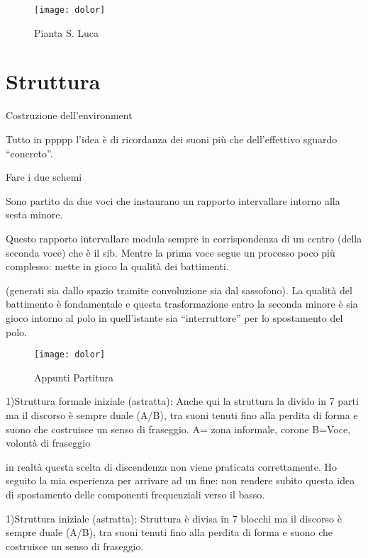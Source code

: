 \begin{figure}
\centering
{\texttt{[image: dolor]}}
\caption[Pianta S. Luca]{Pianta S. Luca}
\label{fig:tetratetra}
\end{figure}

\section*{Struttura}
\label{sec:struttura}

Costruzione dell'environment


Tutto in ppppp l'idea  è di ricordanza dei suoni più che dell'effettivo sguardo “concreto”.

Fare i due schemi

Sono partito da due voci che instaurano un rapporto intervallare intorno alla sesta minore.

Questo rapporto intervallare modula sempre in corrispondenza di un centro
(della seconda voce) che è il sib. Mentre  la prima voce segue un processo poco
più complesso: mette in gioco la qualità dei battimenti.

(generati sia dallo spazio tramite convoluzione sia dal sassofono).
La qualità del battimento è fondamentale e questa trasformazione entro la seconda
minore è sia gioco intorno al polo in quell'istante sia “interruttore” per
lo spostamento del polo.

\begin{figure}
\centering
{\texttt{[image: dolor]}}
\caption[Appunti Partitura]{Appunti Partitura}
\label{fig:tetratetra}
\end{figure}

1)Struttura formale iniziale (astratta):
Anche qui la struttura la divido in 7 parti ma il discorso è sempre duale (A/B),
tra suoni tenuti fino alla perdita di forma e suono che costruisce un senso di fraseggio.
A= zona informale, corone
B=Voce, volontà di fraseggio

in realtà questa scelta di discendenza non viene praticata correttamente.
Ho seguito la mia esperienza per arrivare ad un fine: non rendere subito questa
idea di spostamento delle componenti frequenziali verso il basso.

1)Struttura iniziale (astratta):
Struttura è divisa in 7 blocchi ma il discorso è sempre duale (A/B), tra suoni
tenuti fino alla perdita di forma e suono che costruisce un senso di fraseggio.

